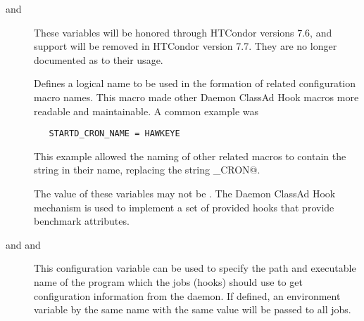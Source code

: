 \begin{description}

\label{param:StartdCronName}
\label{param:ScheddCronName}
\item[\Macro{STARTD\_CRON\_NAME} and \Macro{SCHEDD\_CRON\_NAME}]
  These variables will be honored through HTCondor versions 7.6,
  and support will be removed in HTCondor version 7.7.
  They are no longer documented as to their usage.

  Defines a logical name to be used in the formation of related
  configuration macro names.
  This macro made other Daemon ClassAd Hook macros
  more readable and maintainable.  A common example was
\begin{verbatim}
   STARTD_CRON_NAME = HAWKEYE
\end{verbatim}
  This example allowed the naming of other related macros
  to contain the string \verb@HAWKEYE@ in their name, replacing the
  string \verb@STARTD_CRON@.

  The value of these variables may not be \verb@BENCHMARKS@.
  The Daemon ClassAd Hook mechanism is used to implement a set of provided
  hooks that provide benchmark attributes.

\label{param:StartdCronConfigVal}
\label{param:ScheddCronConfigVal}
\label{param:BenchmarkConfigVal}
\item[\Macro{STARTD\_CRON\_CONFIG\_VAL} and \Macro{SCHEDD\_CRON\_CONFIG\_VAL}
  and \Macro{BENCHMARKS\_CONFIG\_VAL}]
  This configuration variable can be used to specify the
  path and executable name of the
   program which the jobs (hooks) should use to
  get configuration information from the daemon.  If defined,
  an environment variable by the same name with the same value will be
  passed to all jobs.


\end{description}
